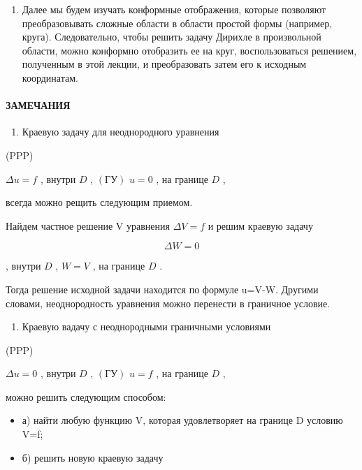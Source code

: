 \documentclass[
  ukrainian,
]{article}
\providecommand{\tightlist}{%
  \setlength{\itemsep}{0pt}\setlength{\parskip}{0pt}}
\begin{document}
\begin{enumerate}
\def\labelenumi{\arabic{enumi}.}
\setcounter{enumi}{1}
\tightlist
\item
  Далее мы будем изучать конформные отображения, которые позволяют
  преобразовывать сложные области в области простой формы (например,
  круга). Следовательно, чтобы решить задачу Дирихле в произвольной
  области, можно конформно отобразить ее на круг, воспользоваться
  решением, полученным в этой лекции, и преобразовать затем его к
  исходным координатам.
\end{enumerate}

\paragraph{ЗАМЕЧАНИЯ}\label{ux437ux430ux43cux435ux447ux430ux43dux438ux44f-8}

\begin{enumerate}
\def\labelenumi{\arabic{enumi}.}
\tightlist
\item
  Краевую задачу для неоднородного уравнения
\end{enumerate}

(PPP)

\(\Delta u = f\) , внутри \(D\) , \((ГУ)\) \(u = 0\) , на границе \(D\)
,

всегда можно рещить следующим приемом.

Найдем частное решение V уравнения \(\Delta V = f\) и решим краевую
задачу

\[
\Delta W = 0
\]

, внутри \(D\) , \(W = V\) , на границе \(D\) .

Тогда решение исходной задачи находится по формуле u=V-W. Другими
словами, неоднородность уравнения можно перенести в граничное условие.

\begin{enumerate}
\def\labelenumi{\arabic{enumi}.}
\setcounter{enumi}{1}
\tightlist
\item
  Краевую вадачу с неоднородными граничными условиями
\end{enumerate}

(PPP)

\(\Delta u = 0\) , внутри \(D\) , \((ГУ)\) \(u = f\) , на границе \(D\)
,

можно решить следующим способом:

\begin{itemize}
\tightlist
\item
  а) найти любую функцию V, которая удовлетворяет на границе D условию
  V=f;
\item
  б) решить новую краевую задачу
\end{itemize}
\end{document}
